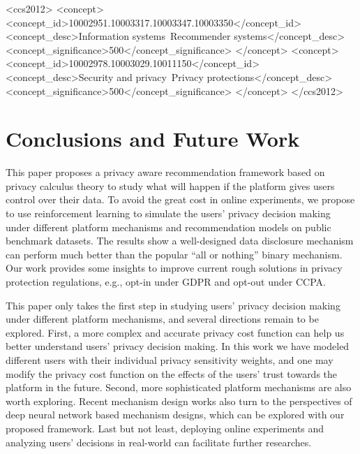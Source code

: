 \documentclass[acmsmall]{acmart}
\begin{document}
\begin{CCSXML}
<ccs2012>
<concept>
<concept_id>10002951.10003317.10003347.10003350</concept_id>
<concept_desc>Information systems~Recommender systems</concept_desc>
<concept_significance>500</concept_significance>
</concept>
  <concept>
  <concept_id>10002978.10003029.10011150</concept_id>
  <concept_desc>Security and privacy~Privacy protections</concept_desc>
  <concept_significance>500</concept_significance>
  </concept>
</ccs2012>
\end{CCSXML}
  




\maketitle







\section{Conclusions and Future Work}

This paper proposes a privacy aware recommendation framework based on privacy calculus theory to study what will happen if the platform gives users control over their data.
To avoid the great cost in online experiments, we propose to use reinforcement learning to simulate the users' privacy decision making under different platform mechanisms and recommendation models on public benchmark datasets.
The results show a well-designed data disclosure mechanism can perform much better than the popular ``all or nothing'' binary mechanism.
Our work provides some insights to improve current rough solutions in privacy protection regulations, e.g., opt-in under GDPR and opt-out under CCPA.

This paper only takes the first step in studying users' privacy decision making under different platform mechanisms, and several directions remain to be explored.
First, a more complex and accurate privacy cost function can help us better understand users' privacy decision making.
In this work we have modeled different users with their individual privacy sensitivity weights, and one may modify the privacy cost function on the effects of the users' trust towards the platform in the future.
Second, more sophisticated platform mechanisms are also worth exploring.
Recent mechanism design works also turn to the perspectives of deep neural network based mechanism designs, which can be explored with our proposed framework.
Last but not least, deploying online experiments and analyzing users' decisions in real-world can facilitate further researches.



\clearpage



\end{document}
